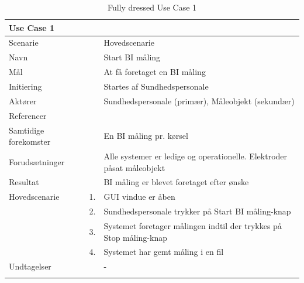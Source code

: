 \documentclass[main.tex]{subfiles}
\begin{document}
\begin{longtabu} to  %
	{\large \textbf{Use Case 1}} && \\
	\toprule
	Scenarie 				&&	Hovedscenarie\\  
	Navn 					&& 	Start BI måling\\
	Mål 					&& 	At få foretaget en BI måling\\
	Initiering 				&& 	Startes af Sundhedspersonale\\
	Aktører 				&& 	Sundhedspersonale (primær), Måleobjekt (sekundær)\\
	Referencer 				&& 	\\
	Samtidige forekomster  	&& 	En BI måling pr. kørsel \\
	Forudsætninger 			&&	Alle systemer er ledige og operationelle. Elektroder påsat måleobjekt\\ 
	Resultat 				&& 	BI måling er blevet foretaget efter ønske\\ \midrule
	Hovedscenarie 			&    1. 	&	GUI vindue er åben\\				 	
							&    2. 	& 	Sundhedspersonale trykker på Start BI måling-knap\\ 
							& 	 3.		&	 Systemet foretager målingen indtil der trykkes på Stop måling-knap \\[-1ex]
                            & 	 4.		&	 Systemet har gemt måling i en fil \\[-1ex]
	Undtagelser 			&			& 	-  \\ \bottomrule
	
	\caption{Fully dressed Use Case 1}
	\label{UC1}
\end{longtabu}
\end{document}

